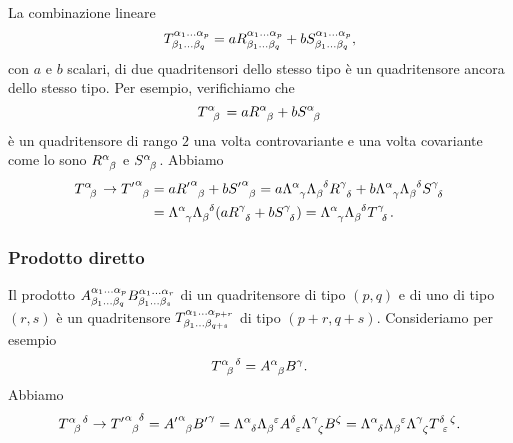 La combinazione lineare
\begin{equation}
  \tensor*{T}{^{\alpha_{1}\dots\alpha_{p}}_{\beta_{1}\dots\beta_{q}}} = a
  \tensor*{R}{^{\alpha_{1}\dots\alpha_{p}}_{\beta_{1}\dots\beta_{q}}} + b
  \tensor*{S}{^{\alpha_{1}\dots\alpha_{p}}_{\beta_{1}\dots\beta_{q}}},
\end{equation}
con $a$ e $b$ scalari, di due quadritensori dello stesso tipo è un quadritensore
ancora dello stesso tipo.  Per esempio, verifichiamo che
\begin{equation}
  \tensor{T}{^{\alpha}_{\beta}} = a \tensor{R}{^{\alpha}_{\beta}} + b
  \tensor{S}{^{\alpha}_{\beta}}
\end{equation}
è un quadritensore di rango $2$ una volta controvariante e una volta covariante
come lo sono $\tensor{R}{^{\alpha}_{\beta}}$ e
$\tensor{S}{^{\alpha}_{\beta}}$. Abbiamo
\begin{equation}
  \begin{split}
    \tensor{T}{^{\alpha}_{\beta}} \to \tensor{{T'}}{^{\alpha}_{\beta}} &= a
    \tensor{{R'}}{^{\alpha}_{\beta}} + b \tensor{{S'}}{^{\alpha}_{\beta}} = a
    \tensor{\Lambda}{^{\alpha}_{\gamma}} \tensor{\Lambda}{_{\beta}^{\delta}}
    \tensor{R}{^{\gamma}_{\delta}} + b \tensor{\Lambda}{^{\alpha}_{\gamma}}
    \tensor{\Lambda}{_{\beta}^{\delta}} \tensor{S}{^{\gamma}_{\delta}} \\
    &= \tensor{\Lambda}{^{\alpha}_{\gamma}}
    \tensor{\Lambda}{_{\beta}^{\delta}}(a \tensor{R}{^{\gamma}_{\delta}} + b
    \tensor{S}{^{\gamma}_{\delta}}) = \tensor{\Lambda}{^{\alpha}_{\gamma}}
    \tensor{\Lambda}{_{\beta}^{\delta}} \tensor{T}{^{\gamma}_{\delta}}.
  \end{split}
\end{equation}

\subsubsection{Prodotto diretto}
\label{sec:prodotto-diretto}

Il prodotto
$\tensor*{A}{^{\alpha_{1}\dots\alpha_{p}}_{\beta_{1}\dots\beta_{q}}}
\tensor*{B}{^{\alpha_{1}\dots\alpha_{r}}_{\beta_{1}\dots\beta_{s}}}$
di un quadritensore di tipo $(p,q)$ e di uno di tipo $(r,s)$ è un quadritensore
$\tensor*{T}{^{\alpha_{1}\dots\alpha_{p+r}}_{\beta_{1}\dots\beta_{q+s}}}$ di
tipo $(p+r,q+s)$.  Consideriamo per esempio
\begin{equation}
  \tensor{T}{^{\alpha}_{\beta}^{\delta}} = \tensor{A}{^{\alpha}_{\beta}}
  \tensor{B}{^{\gamma}}.
\end{equation}
Abbiamo
\begin{equation}
  \tensor{T}{^{\alpha}_{\beta}^{\delta}} \to
  \tensor{{T'}}{^{\alpha}_{\beta}^{\delta}} = \tensor{{A'}}{^{\alpha}_{\beta}}
  \tensor{{B'}}{^{\gamma}} = \tensor{\Lambda}{^{\alpha}_{\delta}}
  \tensor{\Lambda}{_{\beta}^{\epsilon}} \tensor{A}{^{\delta}_{\epsilon}}
  \tensor{\Lambda}{^{\gamma}_{\zeta}} \tensor{B}{^{\zeta}} =
  \tensor{\Lambda}{^{\alpha}_{\delta}} \tensor{\Lambda}{_{\beta}^{\epsilon}}
  \tensor{\Lambda}{^{\gamma}_{\zeta}} \tensor{T}{^{\delta}_{\epsilon}^{\zeta}}.
\end{equation}

